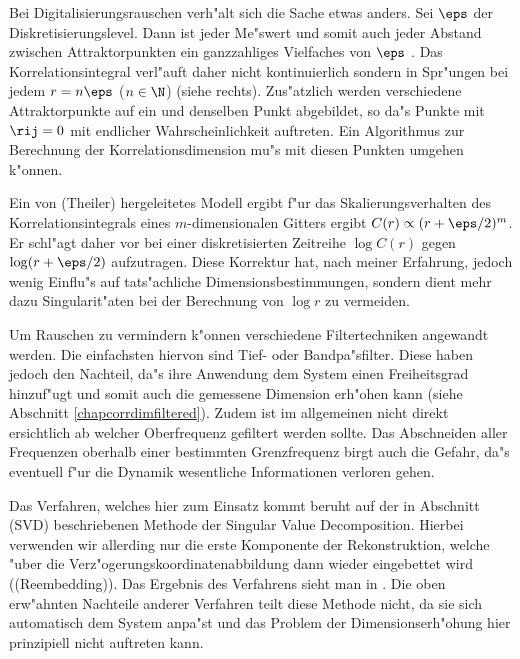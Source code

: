 Bei Digitalisierungsrauschen verh"alt sich die Sache etwas anders. Sei $\eps$ der
Diskretisierungslevel. Dann ist jeder Me"swert und somit auch jeder Abstand zwischen
Attraktorpunkten  ein ganzzahliges Vielfaches von $\eps$ \footnotemark. Das Korrelationsintegral
verl"auft daher nicht kontinuierlich sondern in Spr"ungen bei jedem $r=n\eps$ ($n\in\N$)
(siehe  rechts). 
Zus"atzlich werden verschiedene Attraktorpunkte auf ein und denselben Punkt
abgebildet, so da"s Punkte mit $\rij=0$ mit endlicher Wahrscheinlichkeit auftreten. Ein
Algorithmus zur Berechnung der Korrelationsdimension mu"s mit diesen Punkten umgehen
k"onnen.

Ein von \autor(Theiler) hergeleitetes Modell ergibt f"ur das Skalierungsverhalten des
Korrelationsintegrals eines $m$-dimensionalen Gitters ergibt $C(r)\propto(r+\eps/2)^m$. Er 
schl"agt daher vor bei einer diskretisierten Zeitreihe $\log C(r)$ gegen $\log(r+\eps/2)$
aufzutragen\footnotemark. Diese Korrektur hat, nach meiner Erfahrung, jedoch wenig
Einflu"s auf tats"achliche Dimensionsbestimmungen, sondern dient mehr dazu Singularit"aten 
bei der Berechnung von $\log r$ zu vermeiden.

Um Rauschen zu vermindern k"onnen verschiedene Filtertechniken angewandt werden. Die
einfachsten hiervon sind Tief- oder Bandpa"sfilter. Diese haben jedoch den Nachteil, da"s
ihre Anwendung dem System einen Freiheitsgrad hinzuf"ugt und somit auch die gemessene
Dimension erh"ohen kann (siehe Abschnitt \ref{chapcorrdimfiltered}). Zudem ist im
allgemeinen nicht direkt ersichtlich ab welcher Oberfrequenz gefiltert werden sollte. Das
Abschneiden aller Frequenzen oberhalb einer bestimmten Grenzfrequenz birgt auch die
Gefahr, da"s eventuell f"ur die Dynamik wesentliche Informationen verloren gehen.

Das Verfahren, welches hier zum Einsatz kommt beruht auf der in Abschnitt \korrektur(SVD)
beschriebenen Methode der Singular Value Decomposition. Hierbei verwenden wir allerding
nur die erste Komponente der Rekonstruktion, welche "uber die
Verz"ogerungskoordinatenabbildung dann wieder eingebettet wird (\begriff(Reembedding)).
Das Ergebnis des Verfahrens sieht man in . Die oben erw"ahnten Nachteile 
anderer Verfahren teilt diese Methode nicht, da sie sich automatisch dem System anpa"st
und das Problem der Dimensionserh"ohung hier prinzipiell nicht auftreten kann.

